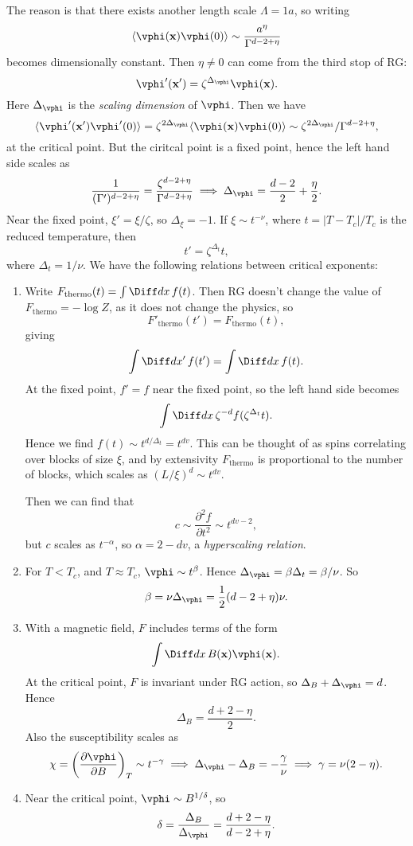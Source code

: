 \documentclass[12pt]{article}
\begin{document}
The reason is that there exists another length scale $\Lambda = 1a$, so writing
\[
\langle \vphi(\mathbf{x}) \vphi(0) \rangle \sim \frac{a^{\eta}}{\Gamma^{d - 2 + \eta}}
\]
becomes dimensionally constant. Then $\eta \neq 0$ can come from the third stop of RG:
\[
\vphi' (\mathbf{x}') = \zeta^{\Delta_{\vphi}} \vphi(\mathbf{x}).
\]
Here $\Delta_{\vphi}$ is the \emph{scaling dimension} of $\vphi$. Then we have
\[
\langle \vphi'(\mathbf{x}') \vphi'(0) \rangle = \zeta^{2 \Delta_{\vphi}} \langle \vphi(\mathbf{x}) \vphi(0) \rangle \sim \zeta^{2 \Delta_{\vphi}} / \Gamma^{d - 2 + \eta},
\]
at the critical point. But the ciritcal point is a fixed point, hence the left hand side scales as
\[
\frac{1}{(\Gamma')^{d - 2 + \eta}} = \frac{\zeta^{d - 2 + \eta}}{\Gamma^{d - 2 + \eta}} \implies \Delta_{\vphi} = \frac{d - 2}{2} + \frac{\eta}{2}.
\]
Near the fixed point, $\xi' = \xi/\zeta$, so $\Delta_{\xi} = -1$. If $\xi \sim t^{-\nu}$, where $t = |T - T_c|/T_c$ is the reduced temperature, then
\[
t' = \zeta^{\Delta_t} t,
\]
where $\Delta_t = 1/\nu$. We have the following relations between critical exponents:
\begin{enumerate}
	\item Write $F_{\mathrm{thermo}}(t) = \int \Diff d x \, f(t)$. Then RG doesn't change the value of $F_{\mathrm{thermo}} = - \log Z$, as it does not change the physics, so
		\[
		F'_{\mathrm{thermo}}(t') = F_{\mathrm{thermo}}(t),
		\]
		giving
		\[
		\int \Diff d x'\, f(t') = \int \Diff d x \, f(t).
		\]
		At the fixed point, $f' = f$ near the fixed point, so the left hand side becomes
		\[
		\int \Diff d x \, \zeta^{-d} f(\zeta^{\Delta_t} t).
		\]
		Hence we find $f(t) \sim t^{d/\Delta_t} = t^{dv}$. This can be thought of as spins correlating over blocks of size $\xi$, and by extensivity $F_{\mathrm{thermo}}$ is proportional to the number of blocks, which scales as $(L/\xi)^{d} \sim t^{dv}$.

		Then we can find that
		\[
		c \sim \frac{\partial^2 f}{\partial t^2} \sim t^{dv - 2},
		\]
		but $c$ scales as $t^{-\alpha}$, so $\alpha = 2 - dv$, a \emph{hyperscaling relation}.
	\item For $T < T_c$, and $T \approx T_c$, $\vphi \sim t^{\beta}$. Hence $\Delta_{\vphi} = \beta \Delta_t = \beta/\nu$. So
		\[
		\beta = \nu \Delta_{\vphi} = \frac{1}{2}(d - 2 + \eta)\nu.
		\]
	\item With a magnetic field, $F$ includes terms of the form
		\[
		\int \Diff d x \, B(\mathbf{x}) \vphi(\mathbf{x}).
		\]
		At the critical point, $F$ is invariant under RG action, so $\Delta_B + \Delta_{\vphi} = d$. Hence
		\[
		\Delta_B = \frac{d + 2 - \eta}{2}.
		\]
		Also the susceptibility scales as
		\[
		\chi = \left( \frac{\partial \vphi}{\partial B} \right)_T \sim t^{-\gamma} \implies \Delta_{\vphi} - \Delta_B = - \frac{\gamma}{\nu} \implies \gamma = \nu(2 - \eta).
		\]
	\item Near the critical point, $\vphi \sim B^{1/\delta}$, so
		\[
		\delta = \frac{\Delta_B}{\Delta_{\vphi}} = \frac{d + 2 - \eta}{d - 2 + \eta}.
		\]
\end{enumerate}
\end{document}
